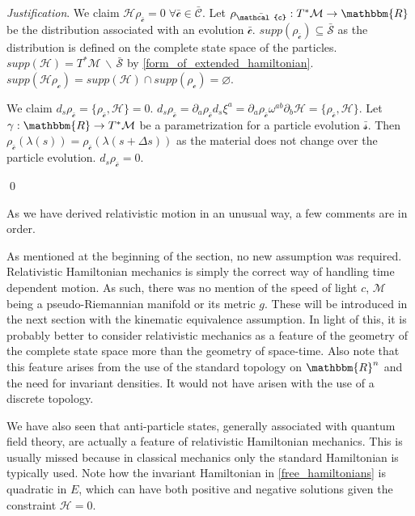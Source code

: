 \documentclass[aps,pra,10pt,twocolumn,floatfix,nofootinbib]{revtex4-1}
\numberwithin{equation}{section}
\theoremstyle{definition}
\newenvironment{justification}{\emph{Justification}.}{\qed}
\begin{document}
\begin{justification}
	We claim $\mathcal{H} \rho_{\bar{\mathcal{c}}} = 0 \; \forall \bar{\mathcal{c}} \in \bar{\mathcal{C}}$. Let $\rho_{\bar{\mathcal{c}}} : T^*\mathcal{M} \rightarrow \mathbbm{R}$ be the distribution associated with an evolution $\bar{\mathcal{c}}$. $supp(\rho_{\bar{\mathcal{c}}}) \subseteq \bar{\mathcal{S}}$ as the distribution is defined on the complete state space of the particles. $supp(\mathcal{H}) = T^*\mathcal{M} \,\backslash\, \bar{\mathcal{S}}$ by \ref{form_of_extended_hamiltonian}. $supp(\mathcal{H} \rho_\mathcal{c}) = supp(\mathcal{H}) \cap supp(\rho_\mathcal{c}) = \varnothing$.
	
	We claim $d_s \rho_{\bar{\mathcal{c}}} = \{ \rho_{\bar{\mathcal{c}}}, \mathcal{H} \} = 0$. $d_s \rho_{\bar{\mathcal{c}}}= \partial_a \rho_{\bar{\mathcal{c}}} d_s \xi^a = \partial_a \rho_{\bar{\mathcal{c}}} \omega^{ab} \partial_b \mathcal{H} = \{ \rho_{\bar{\mathcal{c}}}, \mathcal{H} \}$. Let $\gamma : \mathbbm{R} \rightarrow T^*\mathcal{M}$ be a parametrization for a particle evolution $\bar{\mathcal{s}}$. Then $\rho_{\bar{\mathcal{c}}}(\lambda(s)) = \rho_{\bar{\mathcal{c}}}(\lambda(s + \Delta s))$ as the material does not change over the particle evolution. $d_s \rho_{\bar{\mathcal{c}}} = 0$.
	
\end{justification}

As we have derived relativistic motion in an unusual way, a few comments are in order.

As mentioned at the beginning of the section, no new assumption was required. Relativistic Hamiltonian mechanics is simply the correct way of handling time dependent motion. As such, there was no mention of the speed of light $c$, $\mathcal{M}$ being a pseudo-Riemannian manifold or its metric $g$. These will be introduced in the next section with the kinematic equivalence assumption. In light of this, it is probably better to consider relativistic mechanics as a feature of the geometry of the complete state space more than the geometry of space-time. Also note that this feature arises from the use of the standard topology on $\mathbbm{R}^n$ and the need for invariant densities. It would not have arisen with the use of a discrete topology.

We have also seen that anti-particle states, generally associated with quantum field theory, are actually a feature of relativistic Hamiltonian mechanics. This is usually missed because in classical mechanics only the standard Hamiltonian is typically used. Note how the invariant Hamiltonian in \ref{free_hamiltonians} is quadratic in $E$, which can have both positive and negative solutions given the constraint $\mathcal{H}=0$.
\end{document}

